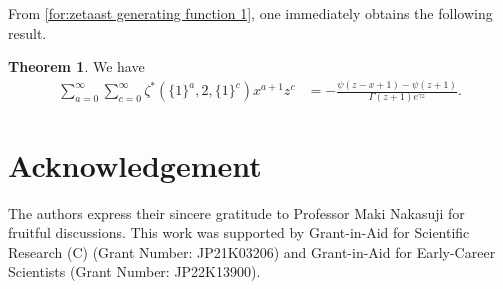 \documentclass[12pt]{amsart}%
\theoremstyle{definition}
\newtheorem{theorem}{Theorem}[section]
\begin{document}
From \eqref{for:zetaast generating function 1},
one immediately obtains the following result.

\begin{theorem}
\label{thm:zast}
We have
\begin{align}
\label{for:zetaast generating function 2}
 \sum^{\infty}_{a=0}\sum^{\infty}_{c=0}
\zeta^{\ast}(\{1\}^a,2,\{1\}^c)x^{a+1}z^c
&=-\frac{\psi(z-x+1)-\psi(z+1)}{\Gamma(z+1)e^{\gamma z}}.
\end{align}
\end{theorem}


\section*{Acknowledgement}
The authors express their sincere gratitude to Professor Maki Nakasuji for fruitful discussions.
This work was supported by Grant-in-Aid for Scientific Research (C) (Grant Number: JP21K03206) and Grant-in-Aid for Early-Career Scientists (Grant Number: JP22K13900).

\end{document}
